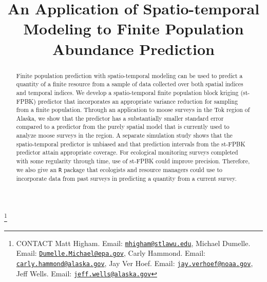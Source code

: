 \documentclass[]{interact}
\theoremstyle{plain}%
\theoremstyle{definition}
\theoremstyle{remark}
\begin{document}

\title{An Application of Spatio-temporal Modeling to Finite Population
Abundance Prediction}


\author{
}

\thanks{CONTACT Matt
Higham. Email: \href{mailto:mhigham@stlawu.edu}{\nolinkurl{mhigham@stlawu.edu}}, Michael
Dumelle. Email: \href{mailto:Dumelle.Michael@epa.gov}{\nolinkurl{Dumelle.Michael@epa.gov}}, Carly
Hammond. Email: \href{mailto:carly.hammond@alaska.gov}{\nolinkurl{carly.hammond@alaska.gov}}, Jay
Ver
Hoef. Email: \href{mailto:jay.verhoef@noaa.gov}{\nolinkurl{jay.verhoef@noaa.gov}}, Jeff
Wells. Email: \href{mailto:jeff.wells@alaska.gov}{\nolinkurl{jeff.wells@alaska.gov}}}

\maketitle

\begin{abstract}
Finite population prediction with spatio-temporal modeling can be used
to predict a quantity of a finite resource from a sample of data
collected over both spatial indices and temporal indices. We develop a
spatio-temporal finite population block kriging (st-FPBK) predictor that
incorporates an appropriate variance reduction for sampling from a
finite population. Through an application to moose surveys in the Tok
region of Alaska, we show that the predictor has a substantially smaller
standard error compared to a predictor from the purely spatial model
that is currently used to analyze moose surveys in the region. A
separate simulation study shows that the spatio-temporal predictor is
unbiased and that prediction intervals from the st-FPBK predictor attain
appropriate coverage. For ecological monitoring surveys completed with
some regularity through time, use of st-FPBK could improve precision.
Therefore, we also give an \texttt{R} package that ecologists and
resource managers could use to incorporate data from past surveys in
predicting a quantity from a current survey.
\end{abstract}
\end{document}
